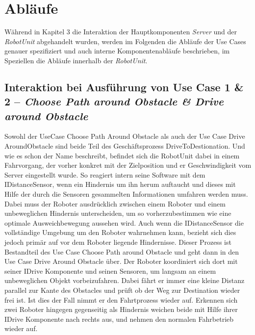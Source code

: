 \section{Abläufe}

Während in Kapitel 3 die Interaktion der Hauptkomponenten \emph{Server} und der \emph{RobotUnit} abgehandelt wurden, werden im Folgenden die Abläufe der Use Cases genauer spezifiziert und auch interne Komponentenabläufe beschrieben, im Speziellen die Abläufe innerhalb der \emph{RobotUnit}.
	
	\subsection*{Interaktion bei Ausführung von Use Case 1 & 2 – \emph{Choose Path around Obstacle & Drive around Obstacle}}
	Sowohl der UseCase Choose Path Around Obstacle als auch der Use Case Drive AroundObstacle sind beide Teil des Geschäftsprozess DriveToDestionation.  Und wie es schon der Name beschreibt, befindet sich die RobotUnit dabei in einem Fahrvorgang, der vorher konkret mit der Zielposition und er Geschwindigkeit vom Server eingestellt wurde. So reagiert intern seine Software mit dem IDistanceSensor, wenn ein Hindernis um ihn herum auftaucht und dieses mit Hilfe der durch die Sensoren gesammelten Informationen umfahren werden muss. Dabei muss der Roboter ausdrücklich zwischen einem Roboter und einem unbeweglichen Hindernis unterscheiden, um so vorherzubestimmen wie eine optimale Ausweichbewegung aussehen wird. Auch wenn die IDistanceSensor die vollständige Umgebung um den Roboter wahrnehmen kann, bezieht sich dies jedoch primär auf vor dem Roboter liegende Hindernisse. Dieser Prozess ist Bestandteil des Use Case Choose Path around Obstacle und geht dann in den Use Case Drive Around Obstacle über. Der Roboter koordiniert sich dort mit seiner IDrive Komponente und seinen Sensoren, um langsam an einem unbeweglichen Objekt vorbeizufahren. Dabei fährt er immer eine kleine Distanz parallel zur Kante des Obstacles und prüft ob der Weg zur Destination wieder frei ist. Ist dies der Fall nimmt er den Fahrtprozess wieder auf. Erkennen sich zwei Roboter hingegen gegenseitig als Hindernis weichen beide mit Hilfe ihrer IDrive Komponente nach rechts aus, und nehmen den normalen Fahrbetrieb wieder auf. \\
	
	
